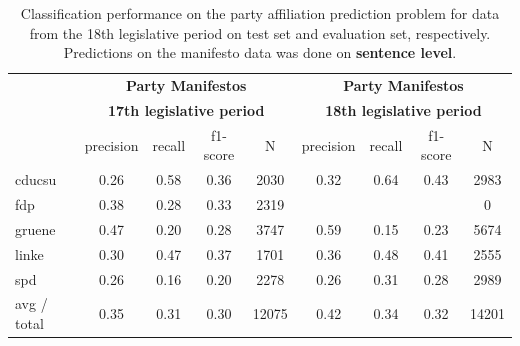 \documentclass{article}
\begin{document}
\begin{table}[t]
\caption{
\label{tab:results_out-of-domain}
Classification performance on the party affiliation prediction problem for data from the 18th legislative period on test set and evaluation set, respectively.  Predictions on the manifesto data was done on {\bf sentence level}.
}
\begin{center}
\begin{tabular}{lcccccccc}
& \multicolumn{4}{c}{\bf Party Manifestos} & \multicolumn{4}{c}{\bf Party Manifestos}\\
& \multicolumn{4}{c}{\bf 17th legislative period} & \multicolumn{4}{c}{\bf 18th legislative period}\\
    &         precision    &recall &  f1-score  & N    &         precision    &recall &  f1-score  & N\\
\hline \hline
    cducsu    &   0.26   &   0.58   &   0.36    &   2030 & 0.32  &    0.64  &    0.43    &  2983\\
    fdp    &   0.38   &   0.28   &   0.33    &   2319 &   &      &        &  0\\
     gruene   &    0.47    &  0.20   &   0.28    &  3747   &0.59   &   0.15   &   0.23   &   5674\\
      linke     &  0.30  &    0.47    &  0.37    &   1701 & 0.36   &   0.48   &   0.41   &   2555\\
        spd     &  0.26  &    0.16   &   0.20    &   2278 & 0.26 &     0.31   &   0.28     & 2989\\
\hline
avg / total    &   0.35  &    0.31  &    0.30   &   12075 &  0.42 &     0.34  &    0.32&     14201\\
%
\end{tabular}
\end{center}

\end{table}
\end{document}

